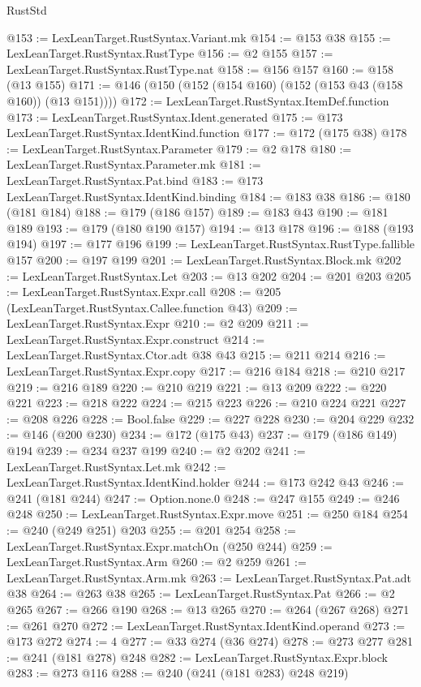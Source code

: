 \begin{lexlean}{RustStd}
\begin{coremodule}
@153 := LexLeanTarget.RustSyntax.Variant.mk
@154 := @153 @38
@155 := LexLeanTarget.RustSyntax.RustType
@156 := @2 @155
@157 := LexLeanTarget.RustSyntax.RustType.nat
@158 := @156 @157
@160 := @158 (@13 @155)
@171 := @146 (@150 (@152 (@154 @160) (@152 (@153 @43 (@158 @160)) (@13 @151))))
@172 := LexLeanTarget.RustSyntax.ItemDef.function
@173 := LexLeanTarget.RustSyntax.Ident.generated
@175 := @173 LexLeanTarget.RustSyntax.IdentKind.function
@177 := @172 (@175 @38)
@178 := LexLeanTarget.RustSyntax.Parameter
@179 := @2 @178
@180 := LexLeanTarget.RustSyntax.Parameter.mk
@181 := LexLeanTarget.RustSyntax.Pat.bind
@183 := @173 LexLeanTarget.RustSyntax.IdentKind.binding
@184 := @183 @38
@186 := @180 (@181 @184)
@188 := @179 (@186 @157)
@189 := @183 @43
@190 := @181 @189
@193 := @179 (@180 @190 @157)
@194 := @13 @178
@196 := @188 (@193 @194)
@197 := @177 @196
@199 := LexLeanTarget.RustSyntax.RustType.fallible @157
@200 := @197 @199
@201 := LexLeanTarget.RustSyntax.Block.mk
@202 := LexLeanTarget.RustSyntax.Let
@203 := @13 @202
@204 := @201 @203
@205 := LexLeanTarget.RustSyntax.Expr.call
@208 := @205 (LexLeanTarget.RustSyntax.Callee.function @43)
@209 := LexLeanTarget.RustSyntax.Expr
@210 := @2 @209
@211 := LexLeanTarget.RustSyntax.Expr.construct
@214 := LexLeanTarget.RustSyntax.Ctor.adt @38 @43
@215 := @211 @214
@216 := LexLeanTarget.RustSyntax.Expr.copy
@217 := @216 @184
@218 := @210 @217
@219 := @216 @189
@220 := @210 @219
@221 := @13 @209
@222 := @220 @221
@223 := @218 @222
@224 := @215 @223
@226 := @210 @224 @221
@227 := @208 @226
@228 := Bool.false
@229 := @227 @228
@230 := @204 @229
@232 := @146 (@200 @230)
@234 := @172 (@175 @43)
@237 := @179 (@186 @149) @194
@239 := @234 @237 @199
@240 := @2 @202
@241 := LexLeanTarget.RustSyntax.Let.mk
@242 := LexLeanTarget.RustSyntax.IdentKind.holder
@244 := @173 @242 @43
@246 := @241 (@181 @244)
@247 := Option.none.{0}
@248 := @247 @155
@249 := @246 @248
@250 := LexLeanTarget.RustSyntax.Expr.move
@251 := @250 @184
@254 := @240 (@249 @251) @203
@255 := @201 @254
@258 := LexLeanTarget.RustSyntax.Expr.matchOn (@250 @244)
@259 := LexLeanTarget.RustSyntax.Arm
@260 := @2 @259
@261 := LexLeanTarget.RustSyntax.Arm.mk
@263 := LexLeanTarget.RustSyntax.Pat.adt @38
@264 := @263 @38
@265 := LexLeanTarget.RustSyntax.Pat
@266 := @2 @265
@267 := @266 @190
@268 := @13 @265
@270 := @264 (@267 @268)
@271 := @261 @270
@272 := LexLeanTarget.RustSyntax.IdentKind.operand
@273 := @173 @272
@274 := 4
@277 := @33 @274 (@36 @274)
@278 := @273 @277
@281 := @241 (@181 @278) @248
@282 := LexLeanTarget.RustSyntax.Expr.block
@283 := @273 @116
@288 := @240 (@241 (@181 @283) @248 @219)

\end{coremodule}
\end{lexlean}
